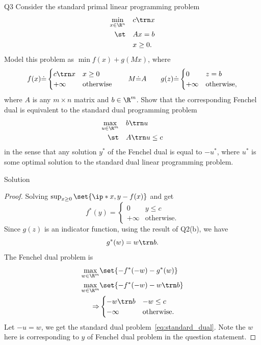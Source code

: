 \documentclass{article}
\theoremstyle{plain}
\theoremstyle{definition}
\theoremstyle{remark}
\begin{document}
\begin{problem}
    {Q3}
    Consider the standard primal linear programming problem
    \begin{align*}
        \min_{x\in\R^n}\quad & c\trn x \\
        \st\quad & Ax=b \\
        & x\geq 0.
    \end{align*}
    Model this problem as $\min f(x)+g(Mx)$, where
    \[
    f(x)\dot{=}
    \begin{cases}
        c\trn x & x\geq 0\\
        +\infty & \text{otherwise}
    \end{cases}
    \qquad
    M\dot{=}A
    \qquad
    g(z)\dot{=}
    \begin{cases}
        0 & z=b\\
        +\infty & \text{otherwise},
    \end{cases}
    \]
    where $A$ is any $m\times n$ matrix and $b\in\R^m$. Show that the corresponding Fenchel dual is equivalent to the standard dual programming problem
    \begin{align}
        \label{eq:standard_dual}
        \begin{split}
            \max_{u\in\R^m}\quad & b\trn u \\
            \st\quad & A\trn u\leq c \\
        \end{split}
    \end{align}
    in the sense that any solution $y^*$ of the Fenchel dual is equal to $-u^*$, where $u^*$ is some optimal solution to the standard dual linear programming problem.
\end{problem}

\begin{solution}
    {Solution}
    \begin{proof}
        Solving $\sup_{x\geq 0}\set{\ip*{x, y}-f(x)}$ and get \[f^*(y)=\begin{cases}
            0 & y\leq c \\
            +\infty & \text{otherwise.}
        \end{cases}\]
        Since $g(z)$ is an indicator function, using the result of Q2(b), we have \[g^*(w)=w\trn b.\]
        The Fenchel dual problem is
        \begin{align*}
            \max_{w\in\R^m}&\set{-f^*(-w)-g^*(w)} \\
            \max_{w\in\R^m}&\set{-f^*(-w)-w\trn b} \\
            \Rightarrow&
            \begin{cases}
                -w\trn b & -w\leq c \\
                -\infty & \text{otherwise.}
            \end{cases}
        \end{align*}
        Let $-u=w$, we get the standard dual problem~\cref{eq:standard_dual}. Note the $w$ here is corresponding to $y$ of Fenchel dual problem in the question statement.
    \end{proof}
\end{solution}
\end{document}
